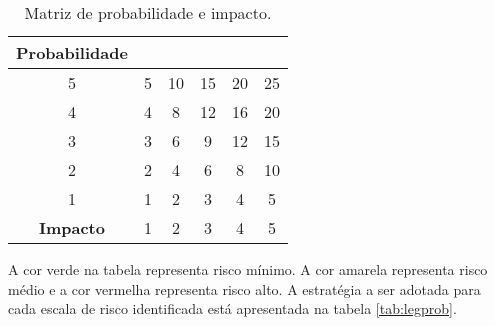  	\begin{table}[]
\centering
\caption{Matriz de probabilidade e impacto.}
\label{tab:matriz_probabilidade_impacto}
\begin{tabular}{|c|ccccc}
\cline{1-1}
\textbf{Probabilidade} &                                                &                                                 &                                                 &                                                 &                                                 \\ \hline
5             & \multicolumn{1}{c|}{\cellcolor[HTML]{34FF34}5} & \multicolumn{1}{c|}{\cellcolor[HTML]{F8FF00}10} & \multicolumn{1}{c|}{\cellcolor[HTML]{FE0000}15} & \multicolumn{1}{c|}{\cellcolor[HTML]{FE0000}20} & \multicolumn{1}{c|}{\cellcolor[HTML]{FE0000}25} \\ \hline
4             & \multicolumn{1}{c|}{\cellcolor[HTML]{34FF34}4} & \multicolumn{1}{c|}{\cellcolor[HTML]{F8FF00}8}  & \multicolumn{1}{c|}{\cellcolor[HTML]{F8FF00}12} & \multicolumn{1}{c|}{\cellcolor[HTML]{FE0000}16} & \multicolumn{1}{c|}{\cellcolor[HTML]{FE0000}20} \\ \hline
3             & \multicolumn{1}{c|}{\cellcolor[HTML]{34FF34}3} & \multicolumn{1}{c|}{\cellcolor[HTML]{F8FF00}6}  & \multicolumn{1}{c|}{\cellcolor[HTML]{F8FF00}9}  & \multicolumn{1}{c|}{\cellcolor[HTML]{F8FF00}12} & \multicolumn{1}{c|}{\cellcolor[HTML]{FE0000}15} \\ \hline
2             & \multicolumn{1}{c|}{\cellcolor[HTML]{34FF34}2} & \multicolumn{1}{c|}{\cellcolor[HTML]{34FF34}4}  & \multicolumn{1}{c|}{\cellcolor[HTML]{F8FF00}6}  & \multicolumn{1}{c|}{\cellcolor[HTML]{F8FF00}8}  & \multicolumn{1}{c|}{\cellcolor[HTML]{F8FF00}10} \\ \hline
1             & \multicolumn{1}{c|}{\cellcolor[HTML]{34FF34}1} & \multicolumn{1}{c|}{\cellcolor[HTML]{34FF34}2}  & \multicolumn{1}{c|}{\cellcolor[HTML]{34FF34}3}  & \multicolumn{1}{c|}{\cellcolor[HTML]{34FF34}4}  & \multicolumn{1}{c|}{\cellcolor[HTML]{34FF34}5}  \\ \hline
\textbf{Impacto}       & \multicolumn{1}{c|}{1}                         & \multicolumn{1}{c|}{2}                          & \multicolumn{1}{c|}{3}                          & \multicolumn{1}{c|}{4}                          & \multicolumn{1}{c|}{5}                          \\ \hline
\end{tabular}
\end{table}

	A cor verde na tabela representa risco mínimo. A cor amarela representa risco médio e a cor vermelha representa risco alto. A estratégia a ser adotada para cada escala de risco identificada está apresentada na tabela \ref{tab:legprob}. 

